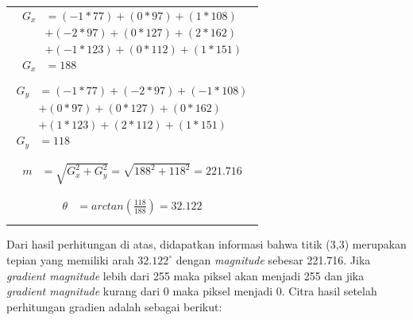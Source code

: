 \begin{table}[H]
	\begin{adjustbox}{width=1\textwidth}
		\begin{tabular}{|p{15cm}|}
			\hline
			\begin{equation}\nonumber
			\begin{aligned}
			G_{x} &= (-1 * 77) + (0 * 97) + (1 * 108) \\
			 	  &+ (-2 * 97) + (0 * 127) + (2 * 162) \\ 
			 	  &+ (-1 * 123) + (0 * 112) + (1 * 151)\\
			G_{x} &= 188\\
			\end{aligned}
			\end{equation}\\
			\begin{equation}\nonumber
			\begin{aligned}
			G_{y} &= (-1 * 77) + (-2 * 97) + (-1 * 108) \\
				  &+ (0 * 97) + (0 * 127) + (0 * 162) \\
				  &+ (1 * 123) + (2 * 112) + (1 * 151) \\
			G_{y} &= 118\\
			\end{aligned}
			\end{equation}\\
			\begin{equation}\nonumber
			\begin{aligned}
			m &= \sqrt{G_{x}^2 + G_{y}^2} = \sqrt{188^2 + 118^2} = 221.716 \\
			\end{aligned}
			\end{equation}\\
			\begin{equation}\nonumber
			\begin{aligned}
			\theta &= arctan(\frac{118}{188}) = 32.122 \\
			\end{aligned}
			\end{equation}\\
			\hline
		\end{tabular}
	\end{adjustbox}
	\label{fig:PerhitunganGradiendanArah}
\end{table}

\noindent Dari hasil perhitungan di atas, didapatkan informasi bahwa titik (3,3) merupakan tepian yang memiliki arah $32.122^\circ$ dengan \textit{magnitude} sebesar 221.716. Jika \textit{gradient magnitude} lebih dari 255 maka piksel akan menjadi 255 dan jika \textit{gradient magnitude} kurang dari 0 maka piksel menjadi 0. Citra hasil setelah perhitungan gradien adalah sebagai berikut:

